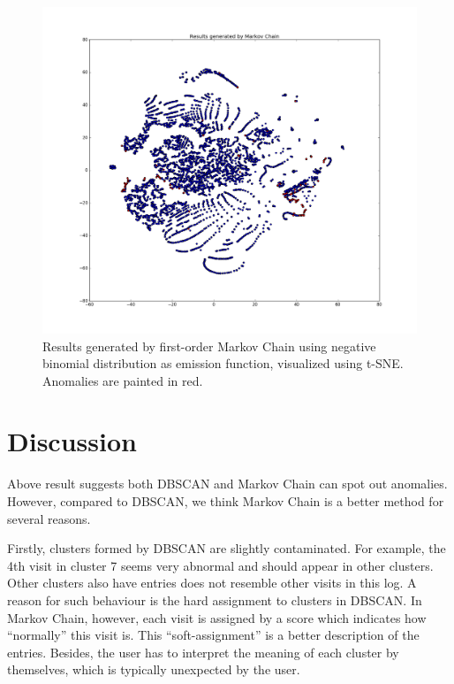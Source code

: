 \begin{figure}[!ht]
	\begin{center}
		\includegraphics[width=\textwidth]{images/MarkovResult}
		\caption{Results generated by first-order Markov Chain using negative binomial distribution as emission function, visualized using t-SNE. Anomalies are painted in red.}
		\label{fig:MarkovResult}
	\end{center}
\end{figure}

\section{Discussion}
\label{sec:discuss}
Above result suggests both DBSCAN and Markov Chain can spot out anomalies. However, compared to DBSCAN, we think Markov Chain is a better method for several reasons. 

Firstly, clusters formed by DBSCAN are slightly contaminated. For example, the 4th visit in cluster 7 seems very abnormal and should appear in other clusters. Other clusters also have entries does not resemble other visits in this log. A reason for such behaviour is the hard assignment to clusters in DBSCAN. In Markov Chain, however, each visit is assigned by a score which indicates how ``normally'' this visit is. This ``soft-assignment'' is a better description of the entries. Besides, the user has to interpret the meaning of each cluster by themselves, which is typically unexpected by the user.

